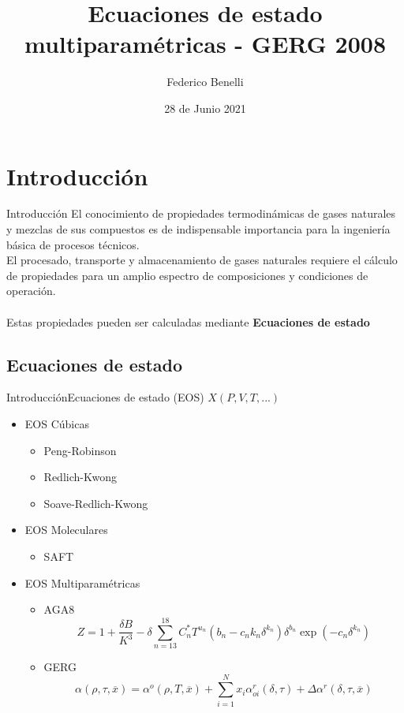 \documentclass[aspectratio=1610,multi,rgb]{beamer}
\title{Ecuaciones de estado multiparamétricas - GERG 2008}
\author{Federico Benelli}
\institute{IPQA}
\date{28 de Junio 2021}
\newcommand{\titleframe}[1]{
\begin{frame} \null\hfill\huge{\shadowbox{#1}}\hspace{1cm} \end{frame}}
\begin{document}
\nocite{*}

\begin{frame}\maketitle\end{frame}

\section{Introducción}
\titleframe{Introducción}

\begin{frame}{Introducción}
	El conocimiento de propiedades termodinámicas de gases naturales y
	mezclas de sus compuestos es de indispensable importancia para la
	ingeniería básica de procesos técnicos.\\
	El procesado, transporte y almacenamiento de gases naturales requiere
	el cálculo de propiedades para un amplio espectro de composiciones y
	condiciones de operación.\\~\\
	Estas propiedades pueden ser calculadas mediante \textbf{Ecuaciones
	de estado}
\end{frame}

\subsection{Ecuaciones de estado}
\begin{frame}{Introducción}{Ecuaciones de estado (EOS)}
	$X(P,V,T,...)$
	\small{
	\begin{itemize}
	\item EOS Cúbicas
	\begin{itemize}
		\item Peng-Robinson
		\item Redlich-Kwong
		\item Soave-Redlich-Kwong
	\end{itemize}
	\item EOS Moleculares
	\begin{itemize}
		\item SAFT
	\end{itemize}
	\item EOS Multiparamétricas
	\begin{itemize}
	\item AGA8 
	\begin{equation}
	\label{eq_aga8}
	Z = 1 + \frac{\delta B}{K^3} - \delta  \sum\limits_{n=13}^{18} C_n^*
	T^{u_n}(b_n-c_nk_n\delta ^{k_n})\delta ^{b_n} \exp (-c_n \delta ^{k_n})
	\end{equation} 

	\item GERG
	\begin{equation}
	\label{eq_gerg}
	\alpha(\rho, \tau, \overline{x}) = 
		\alpha^o(\rho, T, \overline{x})
		+ \sum\limits_{i=1}^N x_i\alpha_{oi}^r(\delta,\tau)
		+ \Delta\alpha^r(\delta,\tau,\overline{x})
	\end{equation}
	\end{itemize}
	\end{itemize}
	}
\end{frame}
\end{document}

